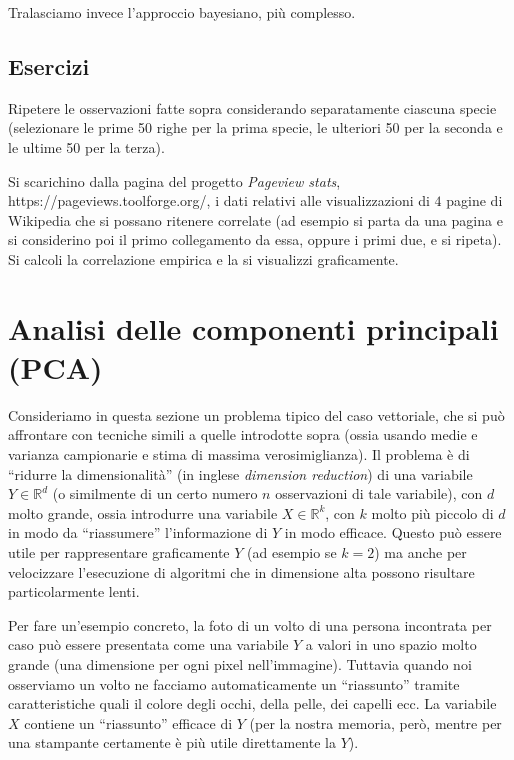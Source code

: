\documentclass[
  italian,
  letterpaper,
]{book}
\newcommand{\R}{\mathbb{R}}
\theoremstyle{definition}
\theoremstyle{remark}
\begin{document}
Tralasciamo invece l'approccio bayesiano, più complesso.

\subsection{Esercizi}\label{esercizi-28}

Ripetere le osservazioni fatte sopra considerando separatamente ciascuna
specie (selezionare le prime 50 righe per la prima specie, le ulteriori
50 per la seconda e le ultime 50 per la terza).

Si scarichino dalla pagina del progetto \emph{Pageview stats},
https://pageviews.toolforge.org/, i dati relativi alle visualizzazioni
di \(4\) pagine di Wikipedia che si possano ritenere correlate (ad
esempio si parta da una pagina e si considerino poi il primo
collegamento da essa, oppure i primi due, e si ripeta). Si calcoli la
correlazione empirica e la si visualizzi graficamente.

\section{Analisi delle componenti principali (PCA)}\label{sec-pca}

Consideriamo in questa sezione un problema tipico del caso vettoriale,
che si può affrontare con tecniche simili a quelle introdotte sopra
(ossia usando medie e varianza campionarie e stima di massima
verosimiglianza). Il problema è di ``ridurre la dimensionalità'' (in
inglese \emph{dimension reduction}) di una variabile \(Y \in \R^d\) (o
similmente di un certo numero \(n\) osservazioni di tale variabile), con
\(d\) molto grande, ossia introdurre una variabile \(X \in \R^k\), con
\(k\) molto più piccolo di \(d\) in modo da ``riassumere''
l'informazione di \(Y\) in modo efficace. Questo può essere utile per
rappresentare graficamente \(Y\) (ad esempio se \(k=2\)) ma anche per
velocizzare l'esecuzione di algoritmi che in dimensione alta possono
risultare particolarmente lenti.

Per fare un'esempio concreto, la foto di un volto di una persona
incontrata per caso può essere presentata come una variabile \(Y\) a
valori in uno spazio molto grande (una dimensione per ogni pixel
nell'immagine). Tuttavia quando noi osserviamo un volto ne facciamo
automaticamente un ``riassunto'' tramite caratteristiche quali il colore
degli occhi, della pelle, dei capelli ecc. La variabile \(X\) contiene
un ``riassunto'' efficace di \(Y\) (per la nostra memoria, però, mentre
per una stampante certamente è più utile direttamente la \(Y\)).
\end{document}
